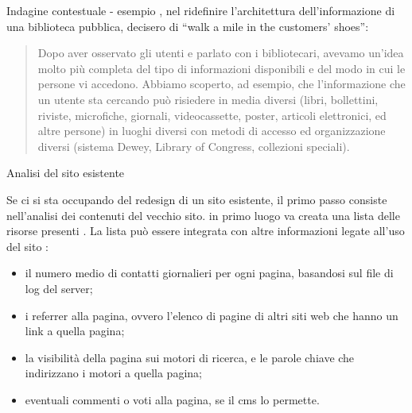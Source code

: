 \documentclass[pdf,mpa]{prosper}
\begin{document}
\begin{slide}{Indagine contestuale - esempio}
\cite{McQuaidMcManus2003}, nel ridefinire l'architettura dell'informazione di una biblioteca pubblica, decisero di ``walk a mile in the customers' shoes'':
\begin{quote}
Dopo aver osservato gli utenti e parlato con i bibliotecari, avevamo un'idea molto più completa del tipo di informazioni disponibili e del modo in cui le persone vi accedono. Abbiamo scoperto, ad esempio, che l'informazione che un utente sta cercando può risiedere in media diversi (libri, bollettini, riviste, microfiche, giornali, videocassette, poster, articoli elettronici, ed altre persone) in luoghi diversi con metodi di accesso ed organizzazione diversi (sistema Dewey, Library of Congress, collezioni speciali). 
\cite{McQuaidMcManus2003}
\end{quote}
\end{slide}

\begin{slide}{Analisi del sito esistente}

Se ci si sta occupando del redesign di un sito esistente, il primo passo consiste nell'analisi dei contenuti del vecchio sito. in primo luogo va creata una lista delle risorse presenti \citep{CaprioGhiglione2003}. La lista può essere integrata con altre informazioni legate all'uso del sito \citep{GamberiniValentini2001}:
\begin{itemize}
\item il numero medio di contatti giornalieri per ogni pagina, basandosi sul file di log del server;
\item i referrer alla pagina, ovvero l'elenco di pagine di altri siti web che hanno un link a quella pagina;
\item la visibilità della pagina sui motori di ricerca, e le parole chiave che indirizzano i motori a quella pagina;
\item eventuali commenti o voti alla pagina, se il cms lo permette.
\end{itemize}

\end{slide}
\end{document}

